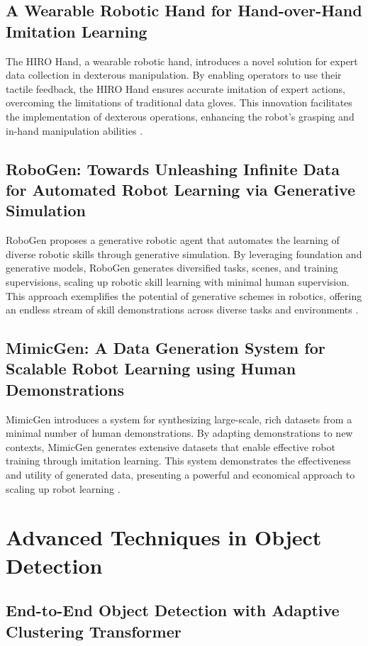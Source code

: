 \documentclass[a4paper]{article}
\begin{document}
\subsection{A Wearable Robotic Hand for Hand-over-Hand Imitation Learning}
The HIRO Hand, a wearable robotic hand, introduces a novel solution for expert data collection in dexterous manipulation. By enabling operators to use their tactile feedback, the HIRO Hand ensures accurate imitation of expert actions, overcoming the limitations of traditional data gloves. This innovation facilitates the implementation of dexterous operations, enhancing the robot's grasping and in-hand manipulation abilities \cite{wei2024wearable}.

\subsection{RoboGen: Towards Unleashing Infinite Data for Automated Robot Learning via Generative Simulation}
RoboGen proposes a generative robotic agent that automates the learning of diverse robotic skills through generative simulation. By leveraging foundation and generative models, RoboGen generates diversified tasks, scenes, and training supervisions, scaling up robotic skill learning with minimal human supervision. This approach exemplifies the potential of generative schemes in robotics, offering an endless stream of skill demonstrations across diverse tasks and environments \cite{wang2023robogen}.

\subsection{MimicGen: A Data Generation System for Scalable Robot Learning using Human Demonstrations}
MimicGen introduces a system for synthesizing large-scale, rich datasets from a minimal number of human demonstrations. By adapting demonstrations to new contexts, MimicGen generates extensive datasets that enable effective robot training through imitation learning. This system demonstrates the effectiveness and utility of generated data, presenting a powerful and economical approach to scaling up robot learning \cite{mandlekar2023mimicgen}.
\section{Advanced Techniques in Object Detection}

\subsection{End-to-End Object Detection with Adaptive Clustering Transformer}
\end{document}
